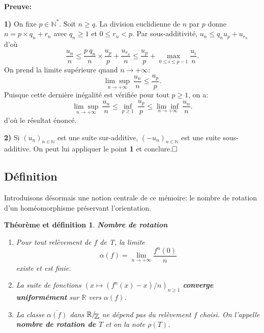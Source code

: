 \documentclass[11pt,a4 paper]{article}
\newtheorem{thmetdefinition}[theoreme]{Théorème et définition}
\newcommand{\Rbb}{\mathbb{R}}
\newcommand*{\EnsembleQuotient}[2]%
{\ensuremath{%
		#1/\!\raisebox{-.65ex}{\ensuremath{\mathcal{#2}}}}}
\newenvironment{thmdefi}{\begin{box_thmdefi}\begin{thmetdefinition}}{\end{thmetdefinition}\end{box_thmdefi}}
\begin{document}
\textbf{Preuve:}
	\par\textbf{1)} On fixe $p \in \mathbb{N}^*$. Soit $n \geq q$. La division euclidienne de $n$ par $p$ donne\\ $n=p \times q_n+r_n$ avec $q_n \geq 1$ et $0 \leq r_n < p$. Par sous-additivité, $u_n \leq q_n u_p + u_{r_n}$ d'où
	$$\frac{u_n}{n} \leq \frac{p \ q_n}{n} \times \frac{u_p}{p} + \frac{u_{r_n}}{n} \leq \frac{u_p}{p} + \underset{0 \leq i \leq p-1}{\max}\frac{u_i}{n}.$$  
	On prend la limite supérieure quand $n \longrightarrow + \infty$:
	$$\underset{n \longrightarrow + \infty}{\lim \sup}\ \frac{u_n}{n}\leq \frac{u_p}{p}.$$
	Puisque cette dernière inégalité est vérifiée pour tout $p \geq 1$, on a:
	$$\underset{n \longrightarrow + \infty}{\lim \sup}\ \frac{u_n}{n} \leq \underset{p \geq 1}{\inf}\ \frac{u_p}{p} \leq \underset{n \longrightarrow + \infty}{\lim \inf}\ \frac{u_n}{n}.$$
	d'où le résultat énoncé.\\
	\par \textbf{2)} Si $(u_n)_{n \in \mathbb{N}}$ est une suite sur-additive, $(-u_n)_{n \in \mathbb{N}}$ est une suite sous-additive. On peut lui appliquer le point \textbf{1} et conclure.$\hfill \square$\\











\subsection{Définition}
Introduisons désormais une notion centrale de ce mémoire: le nombre de rotation d'un homéomorphisme préservant l'orientation.
\begin{thmdefi}\label{nombre de rotation}
	\textbf{Nombre de rotation}
\begin{enumerate}
	\item Pour tout relèvement de $f$ de T, la limite $$\alpha(f) = \underset{n \to + \infty}{\lim} \frac{f^n(0)}{n}$$ existe et est finie.
	
	\item La suite de fonctions $(x \mapsto (f^n(x)-x)/n)_{n\geq 1} $ \textbf{converge uniformément} sur $\mathbb{R}$ vers $\alpha(f)$.
	
	\item  La classe $\overline{\alpha(f)}$ dans $\EnsembleQuotient{\Rbb}{\mathbb{Z}}$ ne dépend pas du relèvement $f$ choisi. On l'appelle \textbf{nombre de rotation de $T$} et on la note $\rho(T)$. 
\end{enumerate}
\end{thmdefi}
\end{document}
